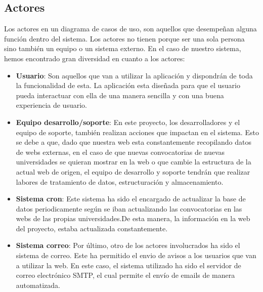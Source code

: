 \subsection{Actores}
Los actores en un diagrama de casos de uso, son aquellos que desempeñan alguna función dentro del sistema. Los actores no tienen porque ser una sola persona sino también un equipo o un sistema externo. En el caso de nuestro sistema, hemos encontrado gran diversidad en cuanto a los actores:

\begin{itemize}
\item\textbf{Usuario}: Son aquellos que van a utilizar la aplicación y dispondrán de toda la funcionalidad de esta. La aplicación esta diseñada para que el usuario pueda interactuar con ella de una manera sencilla y con una buena experiencia de usuario.
\item\textbf{Equipo desarrollo/soporte}: En este proyecto, los desarrolladores y el equipo de soporte, también realizan acciones que impactan en el sistema. Esto se debe a que, dado que nuestra web esta constantemente recopilando datos de webs externas, en el caso de que nuevas convocatorias de nuevas universidades se quieran mostrar en la web o que cambie la estructura de la actual web de origen, el equipo de desarrollo y soporte tendrán que realizar labores de tratamiento de datos, estructuración y almacenamiento.
\item\textbf{Sistema cron}: Este sistema ha sido el encargado de actualizar la base de datos periodicamente según se iban actualizando las convocatorias en las webs de las propias universidades.De esta manera, la información en la web del proyecto, estaba actualizada constantemente.
\item\textbf{Sistema correo}: Por último, otro de los actores involucrados ha sido el sistema de correo. Este ha permitido el envio de avisos a los usuarios que van a utilizar la web. En este caso, el sistema utilizado ha sido el servidor de correo electrónico SMTP, el cual permite el envío de emails de manera automatizada.
\end{itemize}


